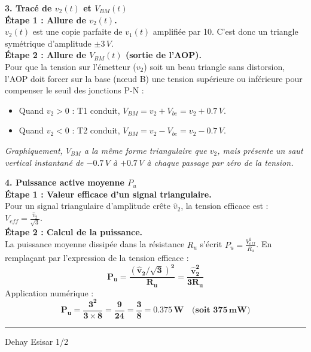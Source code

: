 \documentclass[11pt, a4paper]{article}
\begin{document}
{\vspace{0.2cm}
\textbf{3. Tracé de $v_2(t)$ et $V_{BM}(t)$}\\
\textbf{Étape 1 : Allure de $v_2(t)$.}\\
$v_2(t)$ est une copie parfaite de $v_1(t)$ amplifiée par 10. C'est donc un triangle symétrique d'amplitude $\pm 3\,V$.\\
\textbf{Étape 2 : Allure de $V_{BM}(t)$ (sortie de l'AOP).}\\
Pour que la tension sur l'émetteur ($v_2$) soit un beau triangle sans distorsion, l'AOP doit forcer sur la base (nœud B) une tension supérieure ou inférieure pour compenser le seuil des jonctions P-N :
\begin{itemize}
    \item Quand $v_2 > 0$ : T1 conduit, $V_{BM} = v_2 + V_{be} = v_2 + 0.7\,V$.
    \item Quand $v_2 < 0$ : T2 conduit, $V_{BM} = v_2 - V_{be} = v_2 - 0.7\,V$.
\end{itemize}
\textit{Graphiquement, $V_{BM}$ a la même forme triangulaire que $v_2$, mais présente un saut vertical instantané de $-0.7\,V$ à $+0.7\,V$ à chaque passage par zéro de la tension.}

\vspace{0.2cm}
\textbf{4. Puissance active moyenne $P_u$}\\
\textbf{Étape 1 : Valeur efficace d'un signal triangulaire.}\\
Pour un signal triangulaire d'amplitude crête $\hat{v}_2$, la tension efficace est : $V_{eff} = \frac{\hat{v}_2}{\sqrt{3}}$.\\
\textbf{Étape 2 : Calcul de la puissance.}\\
La puissance moyenne dissipée dans la résistance $R_u$ s'écrit $P_u = \frac{V_{eff}^2}{R_u}$. En remplaçant par l'expression de la tension efficace :
$$ \mathbf{P_u = \frac{\left( \hat{v}_2 / \sqrt{3} \right)^2}{R_u} = \frac{\hat{v}_2^2}{3 R_u}} $$
Application numérique :
$$ \mathbf{P_u = \frac{3^2}{3 \times 8} = \frac{9}{24} = \frac{3}{8} = 0.375\,W \quad \text{(soit } 375\,mW)} $$
}

\vfill
\hrule
\vspace{0.1cm}
\noindent
Dehay \hfill Esisar \hfill 1/2
\end{document}
